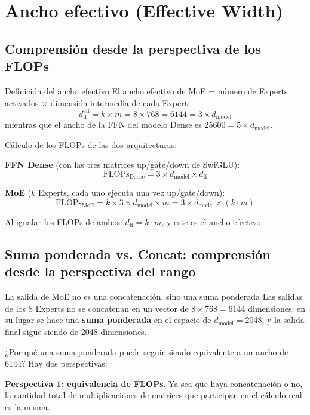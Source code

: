 \section{Ancho efectivo (Effective Width)}

\subsection{Comprensión desde la perspectiva de los FLOPs}

\begin{importantbox}{Definición del ancho efectivo}
El ancho efectivo de MoE = número de Experts activados $\times$ dimensión intermedia de cada Expert:
$$
d_{\text{ff}}^{\text{eff}} = k \times m = 8 \times 768 = 6144 = 3 \times d_{\text{model}}
$$
mientras que el ancho de la FFN del modelo Dense es $25600 = 5 \times d_{\text{model}}$.
\end{importantbox}

Cálculo de los FLOPs de las dos arquitecturas:

\textbf{FFN Dense} (con las tres matrices up/gate/down de SwiGLU):
$$
\text{FLOPs}_{\text{Dense}} = 3 \times d_{\text{model}} \times d_{\text{ff}}
$$

\textbf{MoE} ($k$ Experts, cada uno ejecuta una vez up/gate/down):
$$
\text{FLOPs}_{\text{MoE}} = k \times 3 \times d_{\text{model}} \times m = 3 \times d_{\text{model}} \times (k \cdot m)
$$

Al igualar los FLOPs de ambos: $d_{\text{ff}} = k \cdot m$, y este es el ancho efectivo.

\subsection{Suma ponderada vs. Concat: comprensión desde la perspectiva del rango}

\begin{warningbox}{La salida de MoE no es una concatenación, sino una suma ponderada}
Las salidas de los 8 Experts no se concatenan en un vector de $8 \times 768 = 6144$ dimensiones; en su lugar se hace una \textbf{suma ponderada} en el espacio de $d_{\text{model}} = 2048$, y la salida final sigue siendo de 2048 dimensiones.
\end{warningbox}

¿Por qué una suma ponderada puede seguir siendo equivalente a un ancho de 6144? Hay dos perspectivas:

\textbf{Perspectiva 1: equivalencia de FLOPs}. Ya sea que haya concatenación o no, la cantidad total de multiplicaciones de matrices que participan en el cálculo real es la misma.

